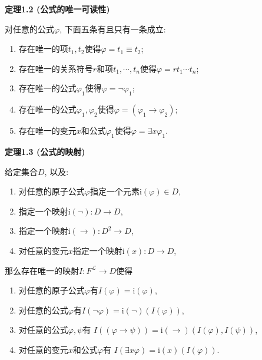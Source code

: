 \newpage

\hypertarget{sec:定理1.2}{}
\noindent\textbf{定理1.2 (公式的唯一可读性)}

对任意的公式$\varphi$, 下面五条有且只有一条成立:
\begin{enumerate}
    \item 存在唯一的项$t_1,t_2$使得$\varphi=t_1\equiv t_2$;
    \item 存在唯一的关系符号$r$和项$t_1,\cdots,t_n$使得$\varphi=rt_1\cdots t_n$;
    \item 存在唯一的公式$\varphi_1$使得$\varphi=\neg\varphi_1$;
    \item 存在唯一的公式$\varphi_1,\varphi_2$使得$\varphi=(\varphi_1\to\varphi_2)$;
    \item 存在唯一的变元$x$和公式$\varphi_1$使得$\varphi=\exists x\varphi_1$.
\end{enumerate}

\vspace{10pt}

\hypertarget{sec:定理1.3}{}
\noindent\textbf{定理1.3 (公式的映射)}

给定集合$D$, 以及:
\begin{enumerate}
    \item 对任意的原子公式$\varphi$指定一个元素$\mathrm{i}(\varphi)\in D$,
    \item 指定一个映射$\mathrm{i}(\neg):D\to D$,
    \item 指定一个映射$\mathrm{i}(\to):D^2\to D$,
    \item 对任意的变元$x$指定一个映射$\mathrm{i}(x):D\to D$,
\end{enumerate}
那么存在唯一的映射$I:F^{\mathcal{L}}\to D$使得
\begin{enumerate}
    \item 对任意的原子公式$\varphi$有$I(\varphi)=\mathrm{i}(\varphi)$,
    \item 对任意的公式$\varphi$有$I(\neg\varphi)=\mathrm{i}(\neg)(I(\varphi))$,
    \item 对任意的公式$\varphi,\psi$有
    $I((\varphi\to\psi))=\mathrm{i}(\to)(I(\varphi),I(\psi))$,
    \item 对任意的变元$x$和公式$\varphi$有
    $I(\exists x\varphi)=\mathrm{i}(x)(I(\varphi))$.
\end{enumerate}


